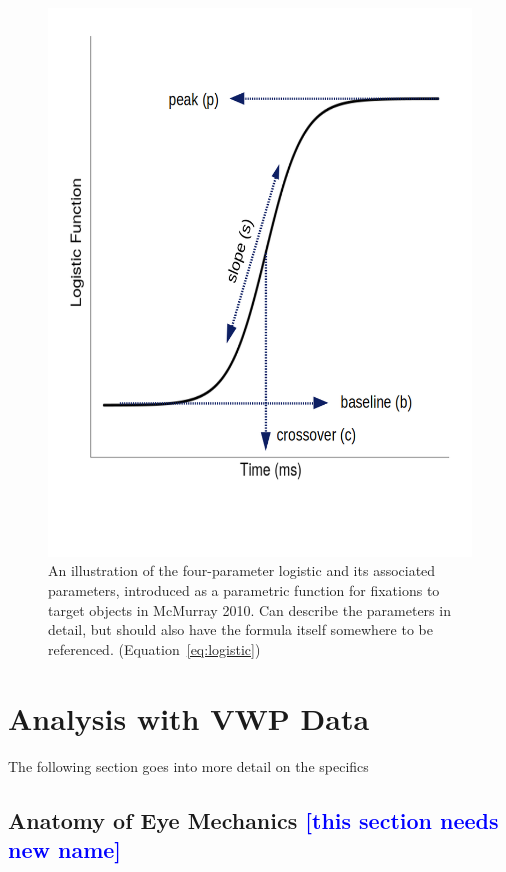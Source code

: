 \documentclass{article}
\providecommand{\cn}[1]{\textcolor{blue}{#1}}
\begin{document}
\begin{figure}[h]
\centering
\includegraphics[scale=0.4]{logistic_label.png}
\caption{An illustration of the four-parameter logistic and its associated parameters, introduced as a parametric function for fixations to target objects in McMurray 2010. Can describe the parameters in detail, but should also have the formula itself somewhere to be referenced. (Equation~\ref{eq:logistic})}
\label{fig:logistic_definition}
\end{figure}



\section{Analysis with VWP Data}

The following section goes into more detail on the specifics


\subsection{Anatomy of Eye Mechanics \cn{[this section needs new name]}}
\end{document}
